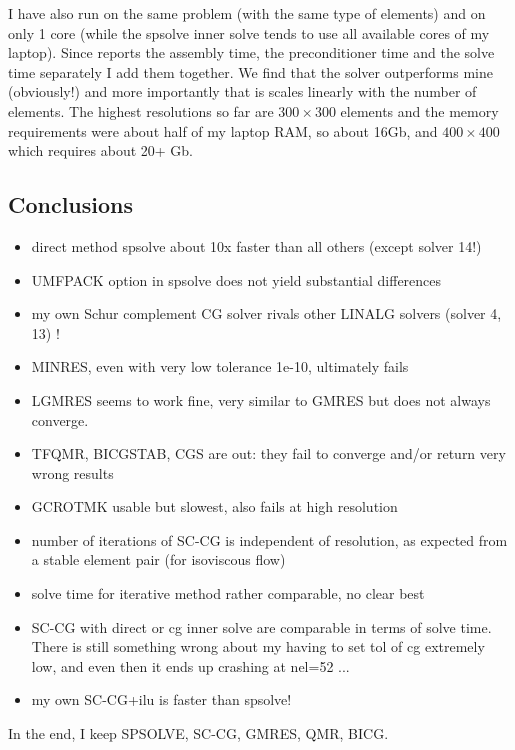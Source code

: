 I have also run \aspect on the same problem (with the same type of elements) and on only 
1 core (while the spsolve inner solve tends to use all available cores of my laptop). 
Since \aspect reports the assembly time, the preconditioner time and the solve
time separately I add them together.
We find that the solver outperforms mine (obviously!) and more importantly that 
is scales linearly with the number of elements. 
The highest resolutions so far are $300\times 300$ elements and the memory requirements 
were about half of my laptop RAM, so about 16Gb, and $400\times 400$ which requires
about 20+ Gb.


\subsection*{Conclusions}

\begin{itemize}
\item direct method spsolve about 10x faster than all others (except solver 14!)
\item UMFPACK option in spsolve does not yield substantial differences
\item my own Schur complement CG solver rivals other LINALG solvers (solver 4, 13) ! 
\item MINRES, even with very low tolerance 1e-10, ultimately fails
\item LGMRES seems to work fine, very similar to GMRES but does not always converge.
\item TFQMR, BICGSTAB, CGS are out: they fail to converge and/or return 
very wrong results
\item GCROTMK usable but slowest, also fails at high resolution 
\item number of iterations of SC-CG is independent of resolution, as expected
from a stable element pair (for isoviscous flow)
\item solve time for iterative method rather comparable, no clear best
\item SC-CG with direct or cg inner solve are comparable in terms of 
solve time. There is still something wrong about my having to 
set tol of cg extremely low, and even then it ends up crashing at nel=52 ...
\item my own SC-CG+ilu is faster than spsolve!
\end{itemize}

In the end, I keep SPSOLVE, SC-CG, GMRES, QMR, BICG.

\newpage
